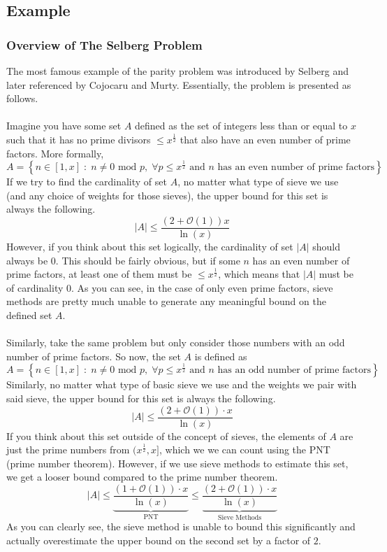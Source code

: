 \documentclass[10pt]{extarticle}
\begin{document}
\subsection{Example}
\subsubsection{Overview of The Selberg Problem}
The most famous example of the parity problem was introduced by Selberg and later referenced by Cojocaru and Murty. Essentially, the problem is presented as follows.\\
\\
Imagine you have some set $A$ defined as the set of integers less than or equal to $x$ such that it has no prime divisors $\leq x^\frac{1}{2}$ that also have an even number of prime factors. More formally,
$$
A = \left\{n \in [1,x] \;:\; n \neq 0 \text{ mod }p, \;\forall p\leq x^{\frac{1}{2}} \text{ and } n \text{ has an even number of prime factors}\right\}
$$
If we try to find the cardinality of set $A$, no matter what type of sieve we use (and any choice of weights for those sieves), the upper bound for this set is always the following.
$$
|A| \leq \frac{(2 + \mathcal{O}(1))x}{\ln(x)}
$$
However, if you think about this set logically, the cardinality of set $|A|$ should always be $0$. This should be fairly obvious, but if some $n$ has an even number of prime factors, at least one of them must be $\leq x^{\frac{1}{2}}$, which means that $|A|$ must be of cardinality $0$. As you can see, in the case of only even prime factors, sieve methods are pretty much unable to generate any meaningful bound on the defined set $A$. \\
\\
Similarly, take the same problem but only consider those numbers with an odd number of prime factors. So now, the set $A$ is defined as
$$
A = \left\{n \in [1,x] \;:\; n \neq 0 \text{ mod }p, \;\forall p\leq x^{\frac{1}{2}} \text{ and } n \text{ has an odd number of prime factors}\right\}
$$
Similarly, no matter what type of basic sieve we use and the weights we pair with said sieve, the upper bound for this set is always the following.
$$
|A| \leq \frac{(2 + \mathcal{O}(1)) \cdot x}{\ln(x)}
$$
If you think about this set outside of the concept of sieves, the elements of $A$ are just the prime numbers from $(x^{\frac{1}{2}}, x]$, which we we can count using the PNT (prime number theorem). However, if we use sieve methods to estimate this set, we get a looser bound compared to the prime number theorem.
$$
|A| \leq \underbrace{\frac{\left(1 + \mathcal{O}(1)\right) \cdot x}{\ln (x)}}_{\text{PNT}} \leq \underbrace{\frac{(2 + \mathcal{O}(1)) \cdot x}{\ln(x)}}_{\text{Sieve Methods}}
$$
As you can clearly see, the sieve method is unable to bound this significantly and actually overestimate the upper bound on the second set by a factor of $2$.
\end{document}
